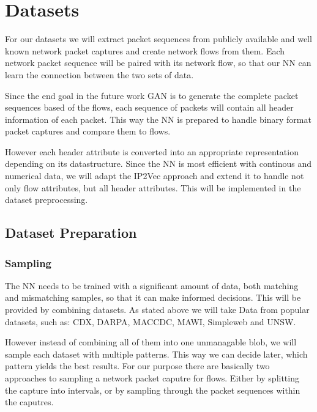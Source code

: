 \documentclass[
	ngerman,
	ruledheaders=section,%
	class=report,%
	thesis={type=bachelor},%
	accentcolor=9c,%
	custommargins=true,%
	marginpar=false,%
	parskip=half-,%
	fontsize=11pt,%
]{tudapub}
\begin{document}

\section{Datasets}

For our datasets we will extract packet sequences from publicly available and well known network packet captures and create network flows from them.
Each network packet sequence will be paired with its network flow,
so that our NN can learn the connection between the two sets of data.

Since the end goal in the future work GAN is to generate the complete packet sequences based of the flows,
each sequence of packets will contain all header information of each packet.
This way the NN is prepared to handle binary format packet captures and compare them to flows.

However each header attribute is converted into an appropriate representation depending on its datastructure.
Since the NN is most efficient with continous and numerical data,
we will adapt the IP2Vec approach and extend it to handle not only flow attributes,
but all header attributes.
This will be implemented in the dataset preprocessing.



\subsection{Dataset Preparation}

\subsubsection{Sampling}

The NN needs to be trained with a significant amount of data, both matching and mismatching samples, so that it can make informed decisions.
This will be provided by combining datasets.
As stated above we will take Data from popular datasets,
such as: CDX, DARPA, MACCDC, MAWI, Simpleweb and UNSW.

However instead of combining all of them into one unmanagable blob,
we will sample each dataset with multiple patterns.
This way we can decide later, which pattern yields the best results.
For our purpose there are basically two approaches to sampling a network packet caputre for flows.
Either by splitting the capture into intervals,
or by sampling through the packet sequences within the caputres.
\end{document}
